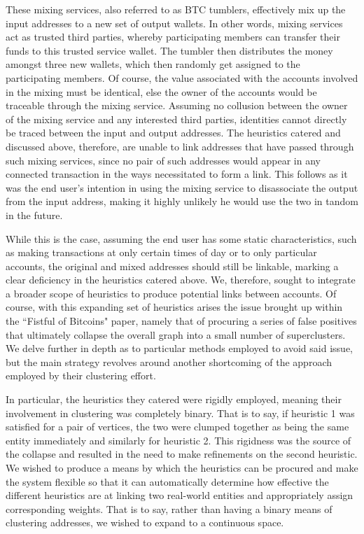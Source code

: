 \documentclass{article}
\begin{document}
These mixing services, also referred to as BTC tumblers, effectively mix up the input addresses to a new set of output wallets. In other words, mixing services act as trusted third parties, whereby participating members can transfer their funds to this trusted service wallet. The tumbler then distributes the money amongst three new wallets, which then randomly get assigned to the participating members. Of course, the value associated with the accounts involved in the mixing must be identical, else the owner of the accounts would be traceable through the mixing service. Assuming no collusion between the owner of the mixing service and any interested third parties, identities cannot directly be traced between the input and output addresses. The heuristics catered and discussed above, therefore, are unable to link addresses that have passed through such mixing services, since no pair of such addresses would appear in any connected transaction in the ways necessitated to form a link. This follows as it was the end user's intention in using the mixing service to disassociate the output from the input address, making it highly unlikely he would use the two in tandom in the future.

While this is the case, assuming the end user has some static characteristics, such as making transactions at only certain times of day or to only particular accounts, the original and mixed addresses should still be linkable, marking a clear deficiency in the heuristics catered above. We, therefore, sought to integrate a broader scope of heuristics to produce potential links between accounts. Of course, with this expanding set of heuristics arises the issue brought up within the ``Fistful of Bitcoins" paper, namely that of procuring a series of false positives that ultimately collapse the overall graph into a small number of superclusters. We delve further in depth as to particular methods employed to avoid said issue, but the main strategy revolves around another shortcoming of the approach employed by their clustering effort.

In particular, the heuristics they catered were rigidly employed, meaning their involvement in clustering was completely binary. That is to say, if heuristic 1 was satisfied for a pair of vertices, the two were clumped together as being the same entity immediately and similarly for heuristic 2. This rigidness was the source of the collapse and resulted in the need to make refinements on the second heuristic. We wished to produce a means by which the heuristics can be procured and make the system flexible so that it can automatically determine how effective the different heuristics are at linking two real-world entities and appropriately assign corresponding weights. That is to say, rather than having a binary means of clustering addresses, we wished to expand to a continuous space. 
\end{document}
